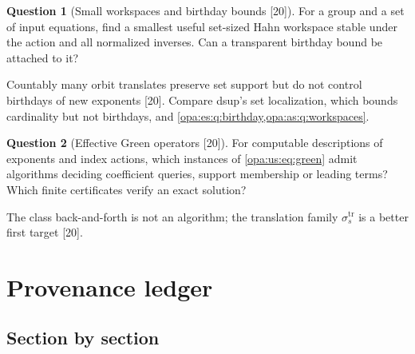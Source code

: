 \documentclass[11pt,oneside]{article}
\numberwithin{equation}{section}
\theoremstyle{definition}
\newtheorem{question}[question]{Question}
\theoremstyle{remark}
\newcommand{\src}[1]{\textup{\textsf{\small[#1]}}}
\begin{document}
\begin{question}[Small workspaces and birthday bounds \src{20}]\label{opa:us:q:workspaces}
For a group and a set of input equations, find a smallest useful set-sized Hahn workspace stable under the action and all normalized inverses. Can a
transparent birthday bound be attached to it?
\end{question}
Countably many orbit translates preserve set support but do not control birthdays of new exponents \src{20}. Compare dsup's set localization,
which bounds cardinality but not birthdays, and \cref{opa:es:q:birthday,opa:as:q:workspaces}.

\begin{question}[Effective Green operators \src{20}]\label{opa:us:q:effective}
For computable descriptions of exponents and index actions, which instances of \eqref{opa:us:eq:green} admit algorithms deciding coefficient queries,
support membership or leading terms? Which finite certificates verify an exact solution?
\end{question}
The class back-and-forth is not an algorithm; the translation family $\sigma^{\mathrm{tr}}_s$ is a better first target \src{20}.

\appendix

\section{Provenance ledger}\label{opa:app:provenance}

\subsection{Section by section}
\end{document}
